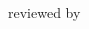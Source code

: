\begin{titlepage}
	\begin{addmargin}[-1cm]{-3cm}
    \begin{center}
        \large
        \hfill
        \vfill
        \begingroup
            \color{Magenta}\Huge{\myTitle} \\ \bigskip
        		\color{Black}\mySubtitle \\ \bigskip
        \endgroup
				\vfill
        \huge{\myName} \\ \bigskip
				\vfill
        \Large\underline{\myDegree} \\ \bigskip
				\vfill
				\small{reviewed by} \\ \\
				\Large{\myProf} \\
				\Large{\myOtherProf} \\ \vfill

				\large\myFaculty \\
        \myDepartment \\
        \myUni \\
				\myLocation \\ \bigskip
				\vfill
				\Large\myTime
    \end{center}
  \end{addmargin}
\end{titlepage}
